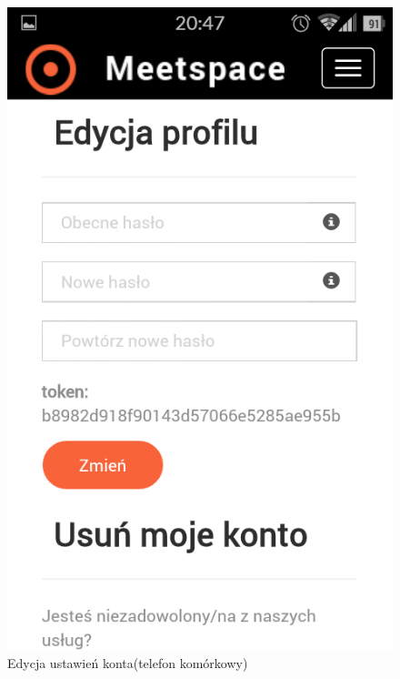     \begin{figure}
      \centering
      \includegraphics[scale=0.5]{images/edit_profile_phone.png}
      \caption{Edycja ustawień konta(telefon komórkowy)}
    \end{figure}

